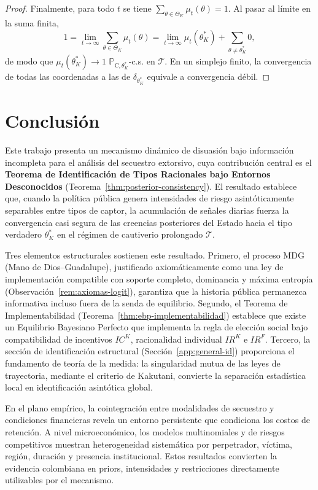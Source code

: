 \documentclass[12pt]{article}
\theoremstyle{definition}
\theoremstyle{remark}
\newcommand{\ProbC}[1]{\mathbb{P}_{\mathrm{C},#1}}
\newcommand{\1}{\mathbf{1}}
\begin{document}
\begin{proof}
Finalmente, para todo $t$ se tiene $\sum_{\theta\in\Theta_K}\mu_t(\theta)=1$. Al pasar al límite en la suma finita,
\[
1=\lim_{t\to\infty}\sum_{\theta\in\Theta_K}\mu_t(\theta)
=\lim_{t\to\infty}\mu_t(\theta_K^\ast)
+\sum_{\theta\neq\theta_K^\ast}0,
\]
de modo que $\mu_t(\theta_K^\ast)\to1$ $\ProbC{\theta_K^\ast}$-c.s. en $\mathcal{T}$. En un simplejo finito, la convergencia de todas las coordenadas a las de $\delta_{\theta_K^\ast}$ equivale a convergencia débil.
\end{proof}

\section{Conclusión}
\label{sec:conclusion}

Este trabajo presenta un mecanismo dinámico de disuasión bajo información incompleta para el análisis del secuestro extorsivo, cuya contribución central es el \textbf{Teorema de Identificación de Tipos Racionales bajo Entornos Desconocidos} (Teorema~\ref{thm:posterior-consistency}). El resultado establece que, cuando la política pública genera intensidades de riesgo asintóticamente separables entre tipos de captor, la acumulación de señales diarias fuerza la convergencia casi segura de las creencias posteriores del Estado hacia el tipo verdadero $\theta_K^\ast$ en el régimen de cautiverio prolongado $\mathcal{T}$.

Tres elementos estructurales sostienen este resultado. Primero, el proceso MDG (Mano de Dios--Guadalupe), justificado axiomáticamente como una ley de implementación compatible con soporte completo, dominancia y máxima entropía (Observación~\ref{rem:axiomas-logit}), garantiza que la historia pública permanezca informativa incluso fuera de la senda de equilibrio. Segundo, el Teorema de Implementabilidad (Teorema~\ref{thm:ebp-implementabilidad}) establece que existe un Equilibrio Bayesiano Perfecto que implementa la regla de elección social bajo compatibilidad de incentivos $IC^K$, racionalidad individual $IR^K$ e $IR^F$. Tercero, la sección de identificación estructural (Sección~\ref{app:general-id}) proporciona el fundamento de teoría de la medida: la singularidad mutua de las leyes de trayectoria, mediante el criterio de Kakutani, convierte la separación estadística local en identificación asintótica global.

En el plano empírico, la cointegración entre modalidades de secuestro y condiciones financieras revela un entorno persistente que condiciona los costos de retención. A nivel microeconómico, los modelos multinomiales y de riesgos competitivos muestran heterogeneidad sistemática por perpetrador, víctima, región, duración y presencia institucional. Estos resultados convierten la evidencia colombiana en priors, intensidades y restricciones directamente utilizables por el mecanismo.
\end{document}
